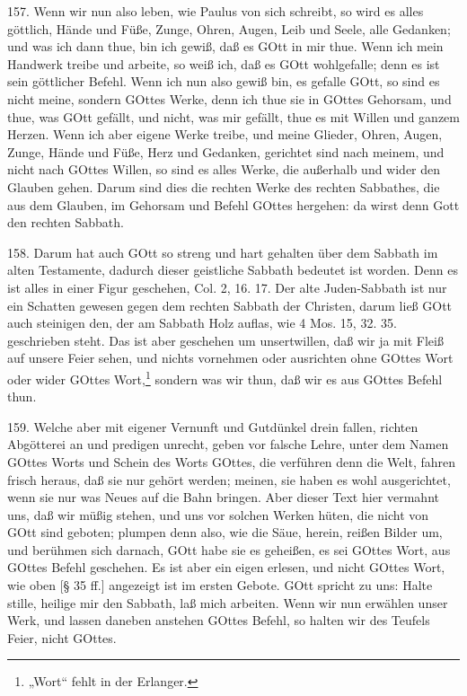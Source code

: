 157. Wenn wir nun also leben, wie Paulus von sich schreibt, so wird es alles göttlich, Hände und Füße, Zunge, Ohren, Augen, Leib und Seele, alle Gedanken; und was ich dann thue, bin ich gewiß, daß es GOtt in mir thue. Wenn ich mein Handwerk treibe und arbeite, so weiß ich, daß es GOtt wohlgefalle; denn es ist sein göttlicher Befehl. Wenn ich nun also gewiß bin, es gefalle GOtt, so sind es nicht meine, sondern GOttes Werke, denn ich thue sie in GOttes Gehorsam, und thue, was GOtt gefällt, und nicht, was mir gefällt, thue es mit Willen und ganzem Herzen. Wenn ich aber eigene Werke treibe, und meine Glieder, Ohren, Augen, Zunge, Hände und Füße, Herz und Gedanken, gerichtet sind nach meinem, und nicht nach GOttes Willen, so sind es alles Werke, die außerhalb und wider den Glauben gehen. Darum sind dies die rechten Werke des rechten Sabbathes, die aus dem Glauben, im Gehorsam und Befehl GOttes hergehen: da wirst denn Gott den rechten Sabbath.

158. Darum hat auch GOtt so streng und hart gehalten über dem Sabbath im alten Testamente, dadurch dieser geistliche Sabbath bedeutet ist worden. Denn es ist alles in einer Figur geschehen, Col. 2, 16. 17. Der alte Juden-Sabbath ist nur ein Schatten gewesen gegen dem rechten Sabbath der Christen, darum ließ GOtt auch steinigen den, der am Sabbath Holz auflas, wie 4 Mos. 15, 32. 35. geschrieben steht. Das ist aber geschehen um unsertwillen, daß wir ja mit
Fleiß auf unsere Feier sehen, und nichts vornehmen oder ausrichten ohne GOttes Wort oder wider GOttes Wort,\footnote{„Wort“ fehlt in der Erlanger.} sondern was wir thun, daß wir es aus GOttes Befehl thun.

159. Welche aber mit eigener Vernunft und Gutdünkel drein fallen, richten Abgötterei an und predigen unrecht, geben vor falsche Lehre, unter dem Namen GOttes Worts und Schein des Worts GOttes, die verführen denn die Welt, fahren frisch heraus, daß sie nur gehört werden; meinen, sie haben es wohl ausgerichtet, wenn sie nur was Neues auf die Bahn bringen. Aber dieser Text hier vermahnt uns, daß wir müßig stehen, und uns vor solchen Werken hüten, die nicht von GOtt sind geboten; plumpen denn also, wie die Säue, herein, reißen Bilder um, und berühmen sich darnach, GOtt habe sie es geheißen, es sei GOttes Wort, aus GOttes Befehl geschehen. Es ist aber ein eigen erlesen, und nicht GOttes Wort, wie oben [§ 35 ff.] angezeigt ist im ersten Gebote. GOtt spricht zu uns: Halte stille, heilige mir den Sabbath, laß mich arbeiten. Wenn wir nun erwählen unser Werk, und lassen daneben anstehen GOttes Befehl, so halten wir des Teufels Feier, nicht GOttes.

